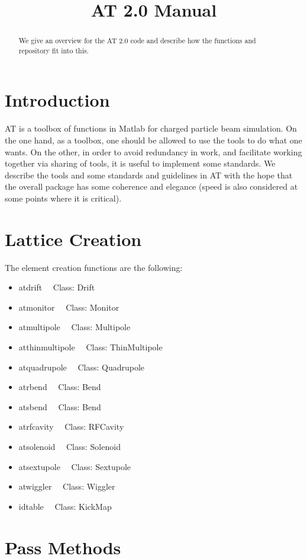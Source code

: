 \documentclass[acus]{article}
\begin{document}
\title{AT 2.0 Manual}
\maketitle
\begin{abstract}
We give an overview for the AT 2.0 code and describe how the functions and repository fit into this.
\end{abstract}


\section{Introduction}
AT is a toolbox of functions in Matlab for charged particle beam simulation.
On the one hand, as a toolbox, one should be allowed to use the tools to do what one wants.
On the other, in order to avoid redundancy in work, and facilitate working together via sharing of tools, it is useful to implement some standards.  We describe the tools and some standards and guidelines in AT with the hope that the overall package has some coherence and elegance (speed is also considered at some points where it is critical).

\section{Lattice Creation}
The element creation functions are the following:
\begin{itemize}
\item atdrift \ \ Class: Drift
\item atmonitor \ \ Class: Monitor
\item atmultipole \ \ Class: Multipole
\item atthinmultipole \ \ Class:  ThinMultipole
\item atquadrupole  \ \ Class: Quadrupole
\item atrbend  \ \ Class: Bend 
\item atsbend \ \ Class: Bend
\item atrfcavity \ \ Class: RFCavity
\item atsolenoid \ \ Class: Solenoid
\item atsextupole  \ \ Class: Sextupole
\item atwiggler  \ \ Class: Wiggler
\item idtable  \ \ Class:  KickMap
\end{itemize}


\section{Pass Methods}
\end{document}
